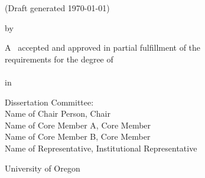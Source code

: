 
   \clearpage
   \thispagestyle{empty}
   {%
   \centering
   \begin{DoubleSpace} \thesistitle

   \ifdraftdoc
   (Draft generated \today)
    \else
   \relax
    \fi
   \end{DoubleSpace}

    \begin{SingleSpace}
    \vspace{2\onelineskip}
    \end{SingleSpace}
        by \\
    \begin{SingleSpace}
    \vspace{2\onelineskip}
    \end{SingleSpace}
        \thesisauthor
      \vspace{2\onelineskip}


    \begin{DoubleSpace}
    A \thesisdoctype \ accepted and approved in partial fulfillment of the\\ 
    requirements for the degree of \\
    \thesisdegree \\
    in \thesismajor \\
    \end{DoubleSpace}

    \begin{SingleSpace}
        \vspace{2\onelineskip}
    \end{SingleSpace}

    \begin{DoubleSpace} %
    Dissertation Committee: \\
    Name of Chair Person, Chair \\
    Name of Core Member A, Core Member \\
    Name of Core Member B, Core Member \\
    Name of Representative,  Institutional Representative \\
    \end{DoubleSpace}

    \begin{SingleSpace}
        \vspace{2\onelineskip}
    \end{SingleSpace}

    \begin{DoubleSpace}
    \begin{center}
        University of Oregon \\
        \thesisgradterm \ \thesisgradyear
    \end{center}
    \end{DoubleSpace}
    
   }
   \enlargethispage{\bottafiddle}
   \clearpage